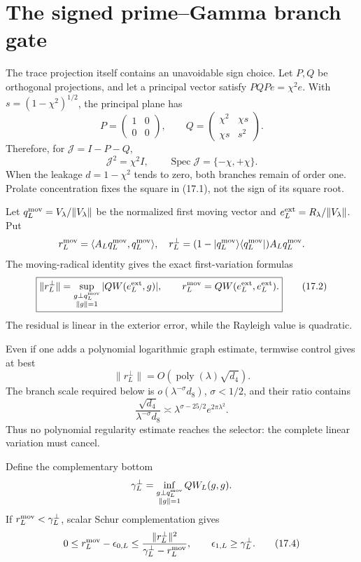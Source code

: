 \documentclass[11pt]{amsart}
\theoremstyle{definition}
\theoremstyle{remark}
\newcommand{\Spec}{\operatorname{Spec}}
\begin{document}
\section{The signed prime--Gamma branch gate}
\label{sec:spg}

The trace projection itself contains an unavoidable sign choice.  Let
\(P,Q\) be orthogonal projections, and let a principal vector satisfy
\(PQP e=\chi^2e\).  With \(s=(1-\chi^2)^{1/2}\), the principal plane has
\[
 P=\begin{pmatrix}1&0\\0&0\end{pmatrix},
 \qquad
 Q=\begin{pmatrix}\chi^2&\chi s\\\chi s&s^2\end{pmatrix}.
\]
Therefore, for \(\mathcal J=I-P-Q\),
\[
 \boxed{
 \mathcal J^2=\chi^2I,
 \qquad \Spec\mathcal J=\{-\chi,+\chi\}.}
 \tag{17.1}
\]
When the leakage \(d=1-\chi^2\) tends to zero, both branches remain of
order one.  Prolate concentration fixes the square in (17.1), not the sign
of its square root.

Let \(q_L^{\rm mov}=V_\lambda/\|V_\lambda\|\) be the normalized first
moving vector and \(e_L^{\rm ext}=R_\lambda/\|V_\lambda\|\).  Put
\[
 r_L^{\rm mov}=\langle A_Lq_L^{\rm mov},q_L^{\rm mov}\rangle,
 \quad
 r_L^\perp=(1-|q_L^{\rm mov}\rangle\langle q_L^{\rm mov}|)
             A_Lq_L^{\rm mov}.
\]
The moving-radical identity gives the exact first-variation formulas
\[
 \boxed{
 \|r_L^\perp\|
 =\sup_{\substack{g\perp q_L^{\rm mov}\\\|g\|=1}}
 |QW(e_L^{\rm ext},g)|,
 \qquad
 r_L^{\rm mov}=QW(e_L^{\rm ext},e_L^{\rm ext}).}
 \tag{17.2}
\]
The residual is linear in the exterior error, while the Rayleigh value is
quadratic.

Even if one adds a polynomial logarithmic graph estimate, termwise control
gives at best
\[
 \|r_L^\perp\|
 =O(\operatorname{poly}(\lambda)\sqrt{d_4}).
\]
The branch scale required below is \(o(\lambda^{-\sigma}d_8)\),
\(\sigma<1/2\), and their ratio contains
\[
 \frac{\sqrt{d_4}}{\lambda^{-\sigma}d_8}
 \asymp\lambda^{\sigma-25/2}e^{2\pi\lambda^2}.
 \tag{17.3}
\]
Thus no polynomial regularity estimate reaches the selector: the complete
linear variation must cancel.

Define the complementary bottom
\[
 \gamma_L^\perp
 =\inf_{\substack{g\perp q_L^{\rm mov}\\\|g\|=1}}
   QW_L(g,g).
\]
If \(r_L^{\rm mov}<\gamma_L^\perp\), scalar Schur complementation gives
\[
 0\le r_L^{\rm mov}-\epsilon_{0,L}
 \le\frac{\|r_L^\perp\|^2}
          {\gamma_L^\perp-r_L^{\rm mov}},
 \qquad
 \epsilon_{1,L}\ge\gamma_L^\perp.
 \tag{17.4}
\]
\end{document}
